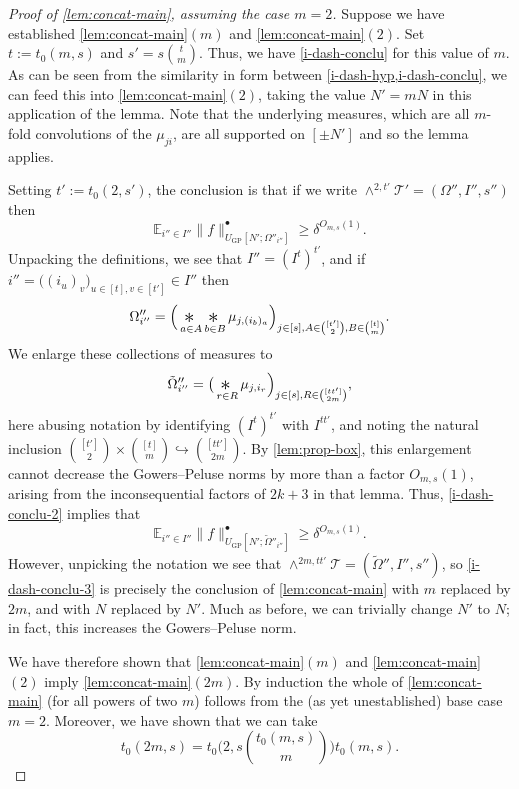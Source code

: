\documentclass[11pt,reqno]{amsart}
\numberwithin{equation}{section}
\theoremstyle{definition}
\theoremstyle{remark}
\newcommand{\snorm}[1]{\lVert#1\rVert}
\newcommand{\mb}{\mathbb}
\newcommand{\mc}{\mathcal}
\renewcommand{\ge}{\geqslant}
\newcommand\E{\mb{E}}
\newcommand\GP{\operatorname{GP}}
\newcommand{\conv}{\mathop{\scalebox{1.5}{\raisebox{-0.2ex}{$\ast$}}}}
\begin{document}
\begin{proof}[Proof of \cref{lem:concat-main}, assuming the case $m = 2$]
Suppose we have established \cref{lem:concat-main}$(m)$ and \cref{lem:concat-main}$(2)$. Set $t := t_0(m, s)$ and $s' = s \binom{t}{m}$. Thus, we have \cref{i-dash-conclu} for this value of $m$. As can be seen from the similarity in form between \cref{i-dash-hyp,i-dash-conclu}, we can feed this into \cref{lem:concat-main}$(2)$, taking the value $N' = m N$ in this application of the lemma. Note that the underlying measures, which are all $m$-fold convolutions of the $\mu_{ji}$, are all supported on $[\pm N']$ and so the lemma applies.

Setting $t' := t_0(2,s')$, the conclusion is that if we write $\wedge^{2,t'} \mc{T}' = (\Omega'', I'', s'') $ then 
\begin{equation}\label{i-dash-conclu-2}\E_{i'' \in I''}\snorm{f}_{ U_{\GP}[N'; \Omega''_{i''}]}
^{\bullet}\ge \delta^{O_{m,s}(1)}.\end{equation}
Unpacking the definitions, we see that $I'' = (I^t)^{t'}$, and if $i'' = \big((i_u)_v\big)_{u \in [t], v \in [t']} \in I''$ then
\[ \Omega''_{i''} = \Big(\conv_{a \in A} \conv_{b \in B} \mu_{j, (i_{b})_a} \Big)_{j \in [s], A \in \binom{[t']}{2}, B \in \binom{[t]}{m}}.\] 
We enlarge these collections of measures to 
\[ \tilde\Omega''_{i''} =  \big(\conv_{r \in R} \mu_{j, i_r}\Big)_{j \in [s], R \in \binom{[tt']}{2m}}, \] here abusing notation by identifying $(I^t)^{t'}$ with $I^{tt'}$, and noting the natural inclusion $\binom{[t']}{2} \times \binom{[t]}{m} \hookrightarrow \binom{[tt']}{2m}$. By \cref{lem:prop-box}, this enlargement cannot decrease the Gowers--Peluse norms by more than a factor $O_{m, s}(1)$, arising from the inconsequential factors of $2k+3$ in that lemma. Thus, \cref{i-dash-conclu-2} implies that 
\begin{equation}\label{i-dash-conclu-3}\E_{i'' \in I''}\snorm{f}_{ U_{\GP}[N'; \tilde\Omega''_{i''}]}
^{\bullet}\ge \delta^{O_{m,s}(1)}.\end{equation}
However, unpicking the notation we see that $\wedge^{2m, tt'} \mc{T} = (\tilde\Omega'', I'', s'')$, so \cref{i-dash-conclu-3} is precisely the conclusion of \cref{lem:concat-main} with $m$ replaced by $2m$, and with $N$ replaced by $N'$. Much as before, we can trivially change $N'$ to $N$; in fact, this increases the Gowers--Peluse norm.

We have therefore shown that \cref{lem:concat-main}$(m)$ and \cref{lem:concat-main}$(2)$ imply \cref{lem:concat-main}$(2m)$. By induction the whole of \cref{lem:concat-main} (for all powers of two $m$) follows from the (as yet unestablished) base case $m = 2$. Moreover, we have shown that we can take
\begin{equation}\label{b4-iter} t_0(2 m, s) = t_0\bigg(2, s \binom{t_0(m, s)}{m}\bigg) t_0(m, s).
\end{equation}
\end{proof}
\end{document}
